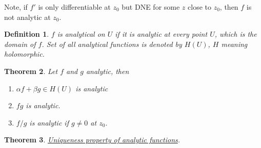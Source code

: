 \documentclass{article}
\newtheorem{theorem}{Theorem}[section]
\newtheorem{definition}[theorem]{Definition}
\newtheorem{one minute paper}[theorem]{One Minute Paper}
\begin{document}
Note, if $f'$ is only differentiable at $z_0$ but DNE for some $z$ close to $z_0$, then $f$ is not analytic at $z_0$.  

\begin{definition}
    $f$ is analytical on $U$ if it is analytic at every point $U$, which is the domain of $f$. Set of all analytical functions is denoted by $H(U)$, $H$ meaning holomorphic. 
\end{definition}

\begin{theorem}
    Let $f$ and $g$ analytic, then 
    \begin{enumerate}
        \item $\alpha f + \beta g \in H(U)$ is analytic
        \item $fg$ is analytic.  
        \item $f/g$ is analytic if $g \neq 0$ at $z_0$. 
    \end{enumerate}
\end{theorem}

\begin{theorem}
    \underline{Uniqueness property of analytic functions}. 
\end{theorem}
\end{document}
